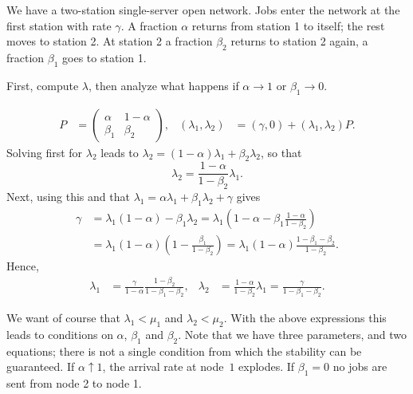 \documentclass[stochastic-or.tex]{subfiles}
\begin{document}
\begin{exercise}\label{ex:47}
We have a two-station single-server open network.
Jobs enter the network at the first station with rate $\gamma$.
A fraction $\alpha$ returns from station 1 to itself; the rest moves to station 2.
At station 2 a fraction $\beta_2$ returns to station 2 again, a fraction $\beta_1$ goes to station 1.
\begin{hint}
First, compute $\lambda$, then analyze what happens if $\alpha\to 1$ or $\beta_1\to 0$.
\end{hint}
\begin{solution}
 \begin{align*}
 P &=
 \begin{pmatrix}
 \alpha & 1- \alpha \\
 \beta_1 & \beta_2
 \end{pmatrix},
&
 (\lambda_1, \lambda_2) &= (\gamma, 0) + (\lambda_1, \lambda_2) P.
 \end{align*}
 Solving first for $\lambda_2$ leads to $\lambda_2 = (1-\alpha) \lambda_1 + \beta_2 \lambda_2$, so that
\begin{equation*}
 \lambda_2 = \frac{1-\alpha}{1-\beta_2} \lambda_1.
\end{equation*}
Next, using this and that $\lambda_1 = \alpha \lambda_1 + \beta_1 \lambda_2 + \gamma$ gives
\begin{equation*}
 \begin{split}
\gamma
&= \lambda_1(1-\alpha) - \beta_1\lambda_2
= \lambda_1\left(1-\alpha - \beta_1\frac{1-\alpha}{1-\beta_2}\right) \\
&= \lambda_1(1-\alpha)\left(1 - \frac{\beta_1 }{1-\beta_2}\right)
= \lambda_1(1-\alpha)\frac{1-\beta_1-\beta_2 }{1-\beta_2}.
 \end{split}
\end{equation*}
Hence,
\begin{align*}
 \lambda_1 &= \frac\gamma{1-\alpha}\frac{1-\beta_2}{1-\beta_1-\beta_2},&
 \lambda_2 &= \frac{1-\alpha}{1-\beta_2} \lambda_1 = \frac\gamma{1-\beta_1-\beta_2}.
\end{align*}

We want of course that $\lambda_1 < \mu_1$ and $\lambda_2 < \mu_2$.
With the above expressions this leads to conditions on $\alpha$, $\beta_1$ and $\beta_2$.
Note that we have three parameters, and two equations; there is not a single condition from which the stability can be guaranteed.
If $\alpha\uparrow 1$, the arrival rate at node~$1$ explodes.
If $\beta_1=0$ no jobs are sent from node 2 to node 1.
\end{solution}
\end{exercise}
\end{document}
